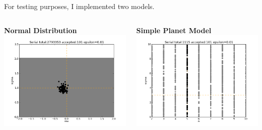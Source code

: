 \documentclass{beamer}
\begin{document}
\begin{frame}{For testing purposes, I implemented two models.}
\begin{center}
\begin{columns}[c] 
\begin{column}[T]{5cm}
\textbf{Normal Distribution}  \\
\includegraphics[scale=.27]{Serialnorm.png}
\end{column}
\begin{column}[T]{5cm}
 \textbf{Simple Planet Model} \\
\includegraphics[scale=.27]{Serial.png}
\end{column}
\end{columns}
\end{center}
\end{frame}
\end{document}
